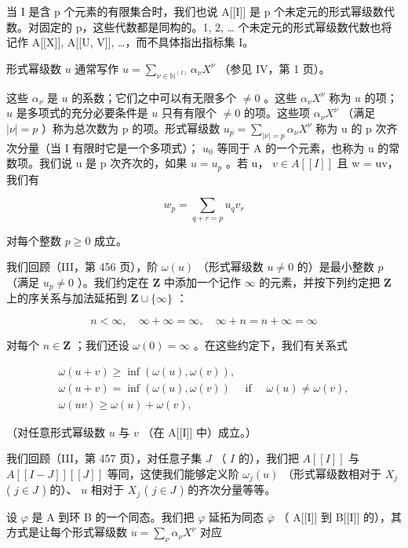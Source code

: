 当 I 是含 p 个元素的有限集合时，我们也说 A{[}{[}I{]}{]} 是 p 个未定元的形式幂级数代数。对固定的 p，这些代数都是同构的。1, 2, \ldots{} 个未定元的形式幂级数代数也将记作 A{[}{[}X{]}{]}, A{[}{[}U, V{]}{]}, \ldots，而不具体指出指标集 I。

形式幂级数 \(u\) 通常写作 \(u = \sum_{\nu \in \mathbb{N}^{(I)}} \alpha_{\nu} X^{\nu}\) （参见 IV，第 1 页）。

这些 \(\alpha_{\nu}\) 是 \(u\) 的系数；它们之中可以有无限多个 \(\neq 0\) 。这些 \(\alpha_{\nu}X^{\nu}\) 称为 \(u\) 的项； \(u\) 是多项式的充分必要条件是 \(u\) 只有有限个 \(\neq 0\) 的项。这些项 \(\alpha_{\nu}X^{\nu}\) （满足 \(|\nu|=p\) ）称为总次数为 p 的项。形式幂级数 \(u_{p}=\sum_{|\nu|=p}\alpha_{\nu}X^{\nu}\) 称为 u 的 p 次齐次分量（当 I 有限时它是一个多项式）； \(u_{0}\) 等同于 A 的一个元素，也称为 u 的常数项。我们说 u 是 p 次齐次的，如果 \(u = u_{p}\) 。若 u， \(v \in A[[I]]\) 且 w = uv，我们有

\[
w _ {p} = \sum_ {q + r = p} u _ {q} v _ {r}\tag{1}
\]

对每个整数 \(p \geqslant 0\) 成立。

我们回顾（III，第 456 页），阶 \(\omega(u)\) （形式幂级数 \(u \neq 0\) 的）是最小整数 \(p\) （满足 \(u_p \neq 0\) ）。我们约定在 \(\mathbf{Z}\) 中添加一个记作 \(\infty\) 的元素，并按下列约定把 \(\mathbf{Z}\) 上的序关系与加法延拓到 \(\mathbf{Z} \cup \{\infty\}\) ：

\[
n <   \infty , \quad \infty + \infty = \infty , \quad \infty + n = n + \infty = \infty
\]

对每个 \(n \in \mathbf{Z}\) ；我们还设 \(\omega(0) = \infty\) 。在这些约定下，我们有关系式

\[
\begin{array}{c} \omega (u + v) \geqslant \inf (\omega (u), \omega (v)), \\ \omega (u + v) = \inf (\omega (u), \omega (v)) \quad \text { if } \quad \omega (u) \neq \omega (v), \\ \omega (u v) \geqslant \omega (u) + \omega (v), \end{array}
\]

（对任意形式幂级数 \(u\) 与 \(v\) （在 A{[}{[}I{]}{]} 中）成立。）

我们回顾（III，第 457 页），对任意子集 \(J\) （ \(I\) 的），我们把 \(A[[I]]\) 与 \(A[[I - J]][[J]]\) 等同，这使我们能够定义阶 \(\omega_{j}(u)\) （形式幂级数相对于 \(X_{j}\) ( \(j \in J\) ) 的）、 \(u\) 相对于 \(X_{j}\) ( \(j \in J\) ) 的齐次分量等等。

设 \(\varphi\) 是 A 到环 B 的一个同态。我们把 \(\varphi\) 延拓为同态 \(\overline{\varphi}\) （ A{[}{[}I{]}{]} 到 B{[}{[}I{]}{]} 的），其方式是让每个形式幂级数 \(u = \sum_{\nu} \alpha_{\nu} X^{\nu}\) 对应

